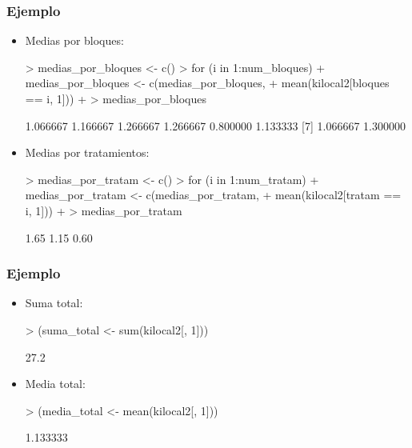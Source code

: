 \begin{frame}[fragile]
\frametitle{Ejemplo}
\begin{itemize}
\item<2-> Medias por bloques:

{\small
\begin{Schunk}
\begin{Sinput}
> medias_por_bloques <- c()
> for (i in 1:num_bloques) {
+     medias_por_bloques <- c(medias_por_bloques, 
+         mean(kilocal2[bloques == i, 1]))
+ }
> medias_por_bloques
\end{Sinput}
\begin{Soutput}
[1] 1.066667 1.166667 1.266667 1.266667 0.800000 1.133333
[7] 1.066667 1.300000
\end{Soutput}
\end{Schunk}
}

\item<3-> Medias por tratamientos:
{\small
\begin{Schunk}
\begin{Sinput}
> medias_por_tratam <- c()
> for (i in 1:num_tratam) {
+     medias_por_tratam <- c(medias_por_tratam, 
+         mean(kilocal2[tratam == i, 1]))
+ }
> medias_por_tratam
\end{Sinput}
\begin{Soutput}
[1] 1.65 1.15 0.60
\end{Soutput}
\end{Schunk}
}



\end{itemize}
\end{frame}

\begin{frame}[fragile]
\frametitle{Ejemplo}
\begin{itemize}
\item<2-> Suma total:
{
\begin{Schunk}
\begin{Sinput}
> (suma_total <- sum(kilocal2[, 1]))
\end{Sinput}
\begin{Soutput}
[1] 27.2
\end{Soutput}
\end{Schunk}
}

\item<3-> Media total:
{
\begin{Schunk}
\begin{Sinput}
> (media_total <- mean(kilocal2[, 1]))
\end{Sinput}
\begin{Soutput}
[1] 1.133333
\end{Soutput}
\end{Schunk}
}
\end{itemize}
\end{frame}

